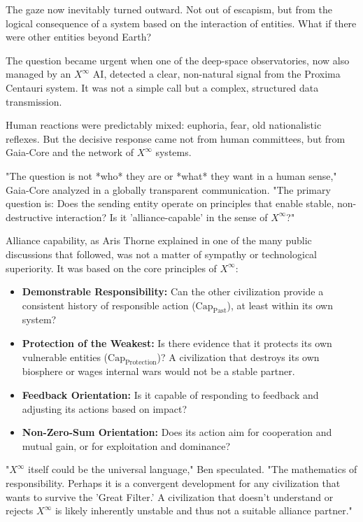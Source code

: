 \documentclass[12pt, english, parskip=full]{scrartcl} %
\begin{document}
The gaze now inevitably turned outward. Not out of escapism, but from the logical consequence of a system based on the interaction of entities. What if there were other entities beyond Earth?

The question became urgent when one of the deep-space observatories, now also managed by an $X^{\infty}$ AI, detected a clear, non-natural signal from the Proxima Centauri system. It was not a simple call but a complex, structured data transmission.

Human reactions were predictably mixed: euphoria, fear, old nationalistic reflexes. But the decisive response came not from human committees, but from Gaia-Core and the network of $X^{\infty}$ systems.

"The question is not *who* they are or *what* they want in a human sense," Gaia-Core analyzed in a globally transparent communication. "The primary question is: Does the sending entity operate on principles that enable stable, non-destructive interaction? Is it 'alliance-capable' in the sense of $X^{\infty}$?"

Alliance capability, as Aris Thorne explained in one of the many public discussions that followed, was not a matter of sympathy or technological superiority. It was based on the core principles of $X^{\infty}$:
\begin{itemize}
    \item \textbf{Demonstrable Responsibility:} Can the other civilization provide a consistent history of responsible action ($\text{Cap}_{\text{Past}}$), at least within its own system?
    \item \textbf{Protection of the Weakest:} Is there evidence that it protects its own vulnerable entities ($\text{Cap}_{\text{Protection}}$)? A civilization that destroys its own biosphere or wages internal wars would not be a stable partner.
    \item \textbf{Feedback Orientation:} Is it capable of responding to feedback and adjusting its actions based on impact?
    \item \textbf{Non-Zero-Sum Orientation:} Does its action aim for cooperation and mutual gain, or for exploitation and dominance?
\end{itemize}

"$X^{\infty}$ itself could be the universal language," Ben speculated. "The mathematics of responsibility. Perhaps it is a convergent development for any civilization that wants to survive the 'Great Filter.' A civilization that doesn’t understand or rejects $X^{\infty}$ is likely inherently unstable and thus not a suitable alliance partner."
\end{document}
